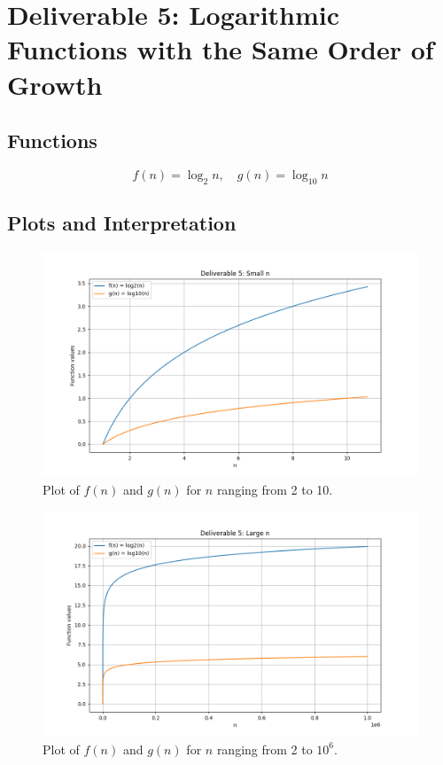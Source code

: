 \documentclass{article}
\begin{document}
\section{Deliverable 5: Logarithmic Functions with the Same Order of Growth}

\subsection{Functions}
\[
f(n) = \log_2 n, \quad g(n) = \log_{10} n
\]

\subsection{Plots and Interpretation}

\begin{figure}[H]
    \centering
    \includegraphics[width=\textwidth]{plot_deliverable5_smalln.png}
    \caption{Plot of $f(n)$ and $g(n)$ for $n$ ranging from 2 to 10.}
    \label{fig:fn4_gn4_2_10}
\end{figure}

\begin{figure}[H]
    \centering
    \includegraphics[width=\textwidth]{plot_deliverable5_largen.png}
    \caption{Plot of $f(n)$ and $g(n)$ for $n$ ranging from 2 to $10^6$.}
    \label{fig:fn4_gn4_2_10e6}
\end{figure}
\end{document}
